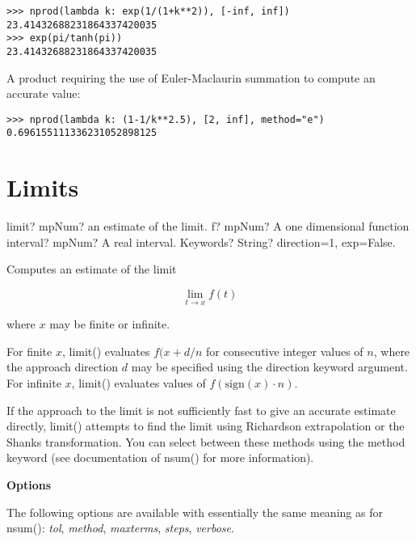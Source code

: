 \begin{lstlisting}
>>> nprod(lambda k: exp(1/(1+k**2)), [-inf, inf])
23.41432688231864337420035
>>> exp(pi/tanh(pi))
23.41432688231864337420035
\end{lstlisting}

A product requiring the use of Euler-Maclaurin summation to compute an accurate value:

\begin{lstlisting}
>>> nprod(lambda k: (1-1/k**2.5), [2, inf], method="e")
0.696155111336231052898125
\end{lstlisting}





\newpage
\section{Limits}

\begin{mpFunctionsExtract}
	\mpFunctionThree
	{limit? mpNum? an estimate of the limit.}
	{f? mpNum? A one dimensional function}
	{interval? mpNum? A real interval.}	
	{Keywords? String? direction=1, exp=False.}	
\end{mpFunctionsExtract}


\vpara
Computes an estimate of the limit

\begin{equation}
\lim\limits_{t \rightarrow x}{f(t)}
\end{equation}

where $x$ may be finite or infinite.

For finite $x$, limit() evaluates $f(x+d/n$ for consecutive integer values of $n$, where the approach direction $d$ may be specified using the direction keyword argument. For infinite $x$, limit() evaluates values of $f(\text{sign}(x) \cdot n)$.

If the approach to the limit is not sufficiently fast to give an accurate estimate directly, limit() attempts to find the limit using Richardson extrapolation or the Shanks transformation. You can select between these methods using the method keyword (see documentation of nsum() for more information).

\vpara
\textbf{Options}

The following options are available with essentially the same meaning as for nsum(): \textit{tol}, \textit{method}, \textit{maxterms}, \textit{steps}, \textit{verbose}.

